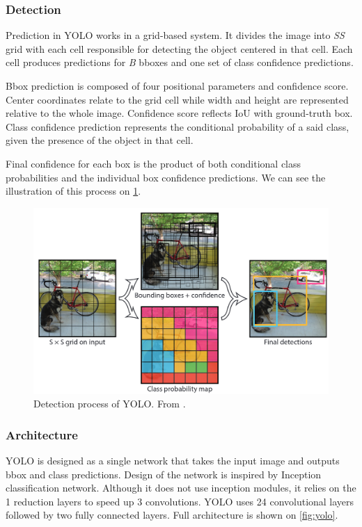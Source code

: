 \subsubsection{Detection}
Prediction in YOLO works in a grid-based system. It divides the image into \textit{S\x S} grid with each cell responsible for detecting the object centered in that cell.  Each cell produces predictions for \textit{B} bboxes and one set of class confidence predictions. 

Bbox prediction is composed of four positional parameters and confidence score. Center coordinates relate to the grid cell while width and height are represented relative to the whole image. Confidence score reflects IoU with ground-truth box. Class confidence prediction represents the conditional probability of a said class, given the presence of the object in that cell. 

Final confidence for each box is the product of both conditional class probabilities and the individual box confidence predictions. We can see the illustration of this process on \cref{fig:yoloDet}.

\begin{figure}
    \centering
    \includegraphics[width=\textwidth]{img/yoloDet}
    \caption[YOLO detection]%
    {Detection process of YOLO. From \cite[fig. 2]{bib:yolo}.}
    \label{fig:yoloDet} 
\end{figure}


\subsubsection{Architecture} 
YOLO is designed as a single network that takes the input image and outputs bbox and class predictions. Design of the network is inspired by Inception classification network. Although it does not use inception modules, it relies on the 1 reduction layers to speed up 3 convolutions. YOLO uses 24 convolutional layers followed by two fully connected layers. Full architecture is shown on \cref{fig:yolo}. 

